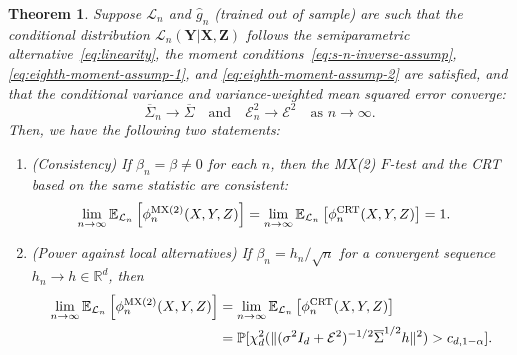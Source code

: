\documentclass[12pt]{article}
\newtheorem{theorem}{Theorem}
\theoremstyle{definition}
\theoremstyle{remark}
\newcommand{\prx}{\bm X}
\newcommand{\srx}{X}
\newcommand{\prz}{\bm Z}
\newcommand{\srz}{Z}
\newcommand{\pry}{{\bm Y}}
\newcommand{\sry}{Y}
\begin{document}
\begin{theorem}  \label{thm:power}
Suppose $\mathcal L_n$ and $\widehat g_n$ (trained out of sample) are such that the conditional distribution $\mathcal L_n(\pry|\prx, \prz)$ follows the semiparametric alternative~\eqref{eq:linearity}, the moment conditions~\eqref{eq:s-n-inverse-assump}, \eqref{eq:eighth-moment-assump-1}, and \eqref{eq:eighth-moment-assump-2} are satisfied, and that the conditional variance and variance-weighted mean squared error converge:
\begin{equation}
	\overline \Sigma_n \rightarrow \overline{\Sigma} \quad \text{and} \quad \mathcal E_n^2 \rightarrow \mathcal E^2 \quad \text{as } n \rightarrow \infty.
	\label{eq:limits}
\end{equation}
Then, we have the following two statements:
\begin{enumerate}
\item[(a)] (Consistency) If $\beta_n = \beta \neq 0$ for each $n$, then the MX(2) $F$-test and the CRT based on the same statistic are consistent:
\begin{equation}
	\begin{split}
		\lim_{n \rightarrow \infty} \mathbb E_{\mathcal L_n}\left[\phi^{\textnormal{MX(2)}}_n(\srx, \sry, \srz)\right] &= \lim_{n \rightarrow \infty} \mathbb E_{\mathcal L_n}\left[\phi^{\textnormal{CRT}}_n(\srx, \sry, \srz)\right] = 1.
		\label{eq:consistency}
	\end{split}
\end{equation}
\item[(b)] (Power against local alternatives) If $\beta_n = h_n/\sqrt{n}$ for a convergent sequence ${h_n \rightarrow h \in \mathbb R^d}$, then
\begin{equation}
	\begin{split}
		\lim_{n \rightarrow \infty} \mathbb E_{\mathcal L_n}\left[\phi^{\textnormal{MX(2)}}_n(\srx, \sry, \srz)\right] &= \lim_{n \rightarrow \infty} \mathbb E_{\mathcal L_n}\left[\phi^{\textnormal{CRT}}_n(\srx, \sry, \srz)\right] \\
		&= \mathbb P[\chi^2_d(\|(\sigma^2I_d +\mathcal E^2)^{-1/2}\overline \Sigma^{1/2} h\|^2) > c_{d,1-\alpha}].
		\label{eq:main-conclusion}
	\end{split}
\end{equation}
\end{enumerate}
\end{theorem}
\end{document}
